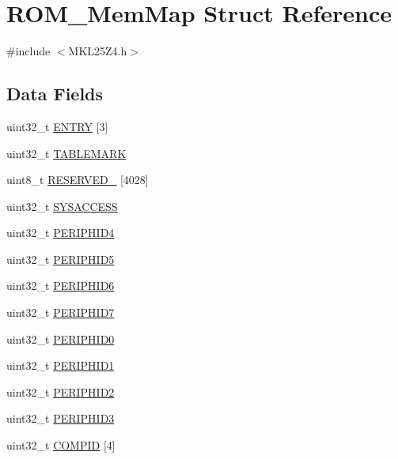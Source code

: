 \hypertarget{struct_r_o_m___mem_map}{}\section{R\+O\+M\+\_\+\+Mem\+Map Struct Reference}
\label{struct_r_o_m___mem_map}


{\ttfamily \#include $<$M\+K\+L25\+Z4.\+h$>$}

\subsection*{Data Fields}
\begin{DoxyCompactItemize}
\item 
uint32\+\_\+t \hyperlink{struct_r_o_m___mem_map_ac9643acfd3ab0c1727bccbe356815321}{E\+N\+T\+RY} \mbox{[}3\mbox{]}
\item 
uint32\+\_\+t \hyperlink{struct_r_o_m___mem_map_af2183c9d5dbc69a514ecef0aa2d22ed3}{T\+A\+B\+L\+E\+M\+A\+RK}
\item 
uint8\+\_\+t \hyperlink{struct_r_o_m___mem_map_a0de996dea396cfe98eb44e61dbdff57d}{R\+E\+S\+E\+R\+V\+E\+D\+\_} \mbox{[}4028\mbox{]}
\item 
uint32\+\_\+t \hyperlink{struct_r_o_m___mem_map_ad414e4ce56e0dd2d8b7c2c2b8e10b1d2}{S\+Y\+S\+A\+C\+C\+E\+SS}
\item 
uint32\+\_\+t \hyperlink{struct_r_o_m___mem_map_a5bb92c53c9f9ff95c2fa012895bb158e}{P\+E\+R\+I\+P\+H\+I\+D4}
\item 
uint32\+\_\+t \hyperlink{struct_r_o_m___mem_map_a3537d737a5805be883aaf9c707789779}{P\+E\+R\+I\+P\+H\+I\+D5}
\item 
uint32\+\_\+t \hyperlink{struct_r_o_m___mem_map_ae80800c5fd92b8bfb3b45ae430e4dc9b}{P\+E\+R\+I\+P\+H\+I\+D6}
\item 
uint32\+\_\+t \hyperlink{struct_r_o_m___mem_map_ab63254ed09fdb6e681bf911fcb73012c}{P\+E\+R\+I\+P\+H\+I\+D7}
\item 
uint32\+\_\+t \hyperlink{struct_r_o_m___mem_map_a132adcf08b28d082698e505ef4cd84ab}{P\+E\+R\+I\+P\+H\+I\+D0}
\item 
uint32\+\_\+t \hyperlink{struct_r_o_m___mem_map_addf6cf7faa9485773a8f5ffd1d243667}{P\+E\+R\+I\+P\+H\+I\+D1}
\item 
uint32\+\_\+t \hyperlink{struct_r_o_m___mem_map_a9ebe3d5d12893e66b6b39ecba5641561}{P\+E\+R\+I\+P\+H\+I\+D2}
\item 
uint32\+\_\+t \hyperlink{struct_r_o_m___mem_map_a511011f97888761a394521be78887fd2}{P\+E\+R\+I\+P\+H\+I\+D3}
\item 
uint32\+\_\+t \hyperlink{struct_r_o_m___mem_map_a51d2026476b6e1547beb909d07d4aa32}{C\+O\+M\+P\+ID} \mbox{[}4\mbox{]}
\end{DoxyCompactItemize}


